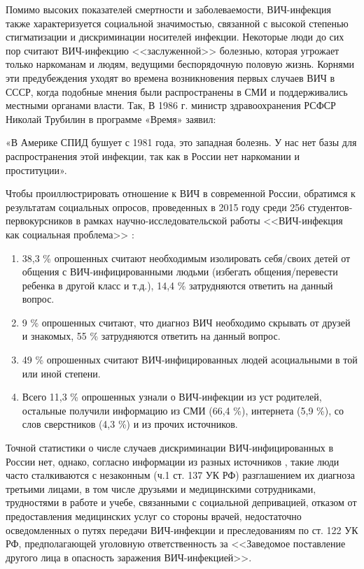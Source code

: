     Помимо высоких показателей смертности и заболеваемости, ВИЧ-инфекция также характеризуется социальной значимостью, связанной с высокой степенью стигматизации и дискриминации носителей инфекции. Некоторые люди до сих пор считают ВИЧ-инфекцию <<заслуженной>> болезнью, которая угрожает только наркоманам и людям, ведущими беспорядочную половую жизнь. Корнями эти предубеждения уходят во времена возникновения первых случаев ВИЧ в СССР, когда подобные мнения были распространены в СМИ и поддерживались местными органами власти. Так, В 1986 г. министр здравоохранения РСФСР Николай Трубилин в программе «Время» заявил:

    «В Америке СПИД бушует с 1981 года, это западная болезнь. У нас нет базы для распространения этой инфекции, так как в России нет наркомании и проституции»\cite{ВИЧ_СССР_цитата_Министра}.

    Чтобы проиллюстрировать отношение к ВИЧ в современной России, обратимся к результатам социальных опросов, проведенных в 2015 году среди 256 студентов-первокурсников в рамках научно-исследовательской работы <<ВИЧ-инфекция как социальная проблема>> \cite{Вич_социальная_проблема2015}:
    
\begin{enumerate}

    \item  38,3 \% опрошенных считают необходимым изолировать себя/своих детей от общения с ВИЧ-инфицированными людьми (избегать общения/перевести ребенка в другой класс и т.д.), 14,4 \% затрудняются ответить на данный вопрос.
    \item  9 \% опрошенных считают, что диагноз ВИЧ необходимо скрывать от друзей и знакомых, 55 \% затрудняются ответить на данный вопрос.
    \item  49 \% опрошенных считают ВИЧ-инфицированных людей асоциальными в той или иной степени.
    \item Всего 11,3 \% опрошенных узнали о ВИЧ-инфекции из уст родителей, остальные получили информацию из СМИ (66,4 \%), интернета (5,9 \%), со слов сверстников (4,3 \%) и из прочих источников.
\end{enumerate}

    Точной статистики о числе случаев дискриминации ВИЧ-инфицированных в России нет, однако, согласно информации из разных источников \cite{Современная_российская_проблематика,spid_center_2862_discrimination, spid_center_1458_discrimination}, такие люди часто сталкиваются с незаконным (ч.1 ст. 137 УК РФ) разглашением их диагноза третьими лицами, в том числе друзьями и медицинскими сотрудниками, трудностями в работе и учебе, связанными с социальной депривацией, отказом от предоставления медицинских услуг со стороны врачей, недостаточно осведомленных о путях передачи ВИЧ-инфекции и преследованиям по ст. 122 УК РФ, предполагающей уголовную ответственность за <<Заведомое поставление другого лица в опасность заражения ВИЧ-инфекцией>>.

